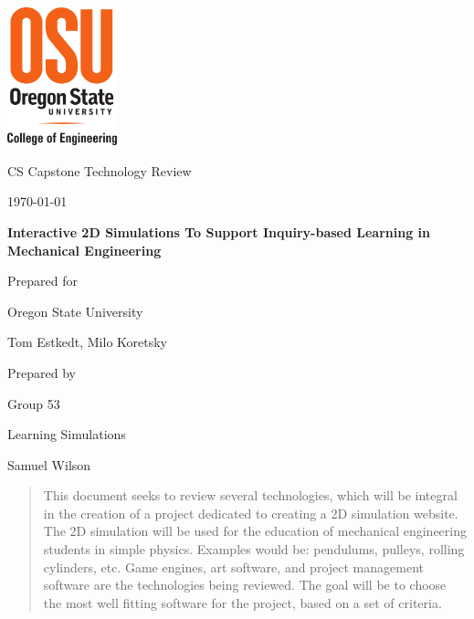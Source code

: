 \documentclass[capstone.tex]{subfiles}
\def \CapstoneTeamName{		Learning Simulations}
\def \CapstoneTeamNumber{		53}
\def \GroupMemberOne{			Cameron Friel}
\def \GroupMemberThree{			Samuel Wilson}
\def \CapstoneProjectName{		Interactive 2D Simulations To  Support Inquiry-based Learning in Mechanical Engineering}
\def \CapstoneSponsorCompany{	Oregon State University}
\def \CapstoneSponsorPerson{		Tom Estkedt, Milo Koretsky }
\def \DocType{		%
				Technology Review
				}
\newcommand{\NameSigPair}[1]{\par
\makebox[2.75in][r]{#1} \hfil 	\makebox[3.25in]{\makebox[2.25in]{\hrulefill} \hfill		\makebox[.75in]{\hrulefill}}
\par\vspace{-12pt} \textit{\tiny\noindent
\makebox[2.75in]{} \hfil		\makebox[3.25in]{\makebox[2.25in][r]{Signature} \hfill	\makebox[.75in][r]{Date}}}}
\renewcommand{\NameSigPair}[1]{#1}
\begin{document}
\begin{titlepage}
    \begin{singlespace}
    	\includegraphics[height=4cm]{coe_v_spot1}
        \hfill 
        \par\vspace{.2in}
        \centering
        \scshape{
            \huge CS Capstone \DocType \par
            {\large\today}\par
            \vspace{.5in}
            \textbf{\Huge\CapstoneProjectName}\par
            \vfill
            {\large Prepared for}\par
            \Huge \CapstoneSponsorCompany\par
            \vspace{5pt}
            {\Large\NameSigPair{\CapstoneSponsorPerson}\par}
            {\large Prepared by }\par
            Group\CapstoneTeamNumber\par
            \CapstoneTeamName\par 
            \vspace{5pt}
            {\Large
                \NameSigPair{\GroupMemberThree}\par
            }
            \vspace{20pt}
        }
        \begin{abstract}
    This document seeks to review several technologies, which will be integral in the creation of a project dedicated to creating a 2D simulation website. The 2D simulation will be used for the education of mechanical engineering students in simple physics. Examples would be: pendulums, pulleys, rolling cylinders, etc. Game engines, art software, and project management software are the technologies being reviewed. The goal will be to choose the most well fitting software for the project, based on a set of criteria.   
        \end{abstract}     
    \end{singlespace}
\end{titlepage}
\newpage
\clearpage
{}
\end{document}
